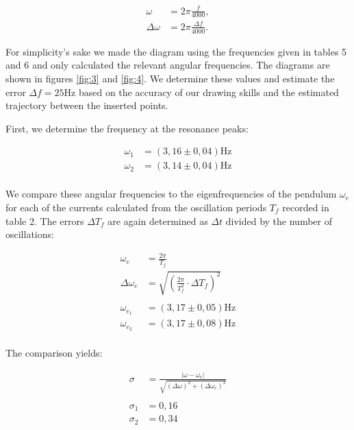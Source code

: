 \documentclass{article}
\begin{document}
\begin{equation}
    \begin{split}
        \omega &= 2\pi \frac{f}{4000}, \\
        \Delta \omega &= 2\pi \frac{\Delta f}{4000}.
    \end{split}
    \label{eq:93}
\end{equation}

For simplicity's sake we made the diagram using the frequencies given in tables 5 and 6 and only calculated the relevant angular frequencies. The diagrams are shown in figures \ref{fig:3} and \ref{fig:4}. We determine these values and estimate the error $\Delta f = 25$Hz based on the accuracy of our drawing skills and the estimated trajectory between the inserted points.

First, we determine the frequency at the resonance peaks:

\begin{equation}
    \begin{split}
        \omega_1 &= (3,16 \pm 0,04) \text{Hz} \\
        \omega_2 &= (3,14 \pm 0,04) \text{Hz} \\
    \end{split}
    \label{eq:92}
\end{equation}

We compare these angular frequencies to the eigenfrequencies of the pendulum $\omega_e$ for each of the currents calculated from the oscillation periods $T_f$ recorded in table 2. The errors $\Delta T_f$ are again determined as $\Delta t$ divided by the number of oscillations:

\begin{equation}
    \begin{split}
        \omega_e &= \frac{2\pi}{T_{f}} \\ 
        \Delta \omega_e &= \sqrt{\left( \frac{2\pi}{T_{f}^2} \cdot \Delta T_f \right)^2} \\ \\
        \omega_{e_1} &= (3,17 \pm 0,05) \text{Hz} \\
        \omega_{e_2} &= (3,17 \pm 0,08) \text{Hz} \\        
    \end{split}
\end{equation}

\newpage

The comparison yields:

\begin{equation}
    \begin{split}
        \sigma &= \frac{|\omega - \omega_e|}{\sqrt{(\Delta \omega)^2 + (\Delta \omega_e)^2}} \\ \\
        \sigma_1 &= 0,16 \\
        \sigma_2 &= 0,34 
    \end{split}
\end{equation}
\end{document}
